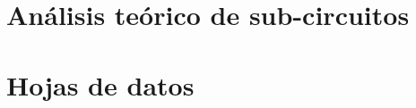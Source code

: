 \pagestyle{allpages}

\appendix


\appendixpage
\addappheadtotoc



\section{Análisis teórico de sub-circuitos}

\resetallcounters


\clearpage



\clearpage



\cleardoublepage

\section{Hojas de datos}


\cleardoublepage



